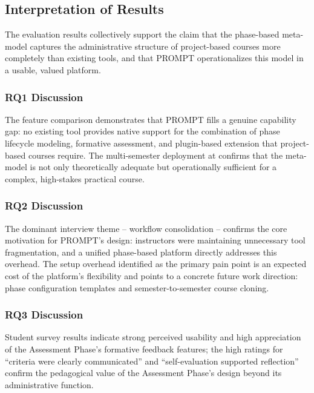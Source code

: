 
\label{sec:discussion}

\subsection{Interpretation of Results}

The evaluation results collectively support the claim that the phase-based meta-model captures the administrative structure of project-based courses more completely than existing tools, and that PROMPT operationalizes this model in a usable, valued platform.

\subsubsection{RQ1 Discussion}

The feature comparison demonstrates that PROMPT fills a genuine capability gap:
no existing tool provides native support for the combination of phase lifecycle modeling, formative assessment, and plugin-based extension that project-based courses require.
The multi-semester deployment at \university{} confirms that the meta-model is not only theoretically adequate but operationally sufficient for a complex, high-stakes practical course.

\subsubsection{RQ2 Discussion}

The dominant interview theme -- workflow consolidation -- confirms the core motivation for PROMPT's design:
instructors were maintaining unnecessary tool fragmentation, and a unified phase-based platform directly addresses this overhead.
The setup overhead identified as the primary pain point is an expected cost of the platform's flexibility and points to a concrete future work direction: phase configuration templates and semester-to-semester course cloning.

\subsubsection{RQ3 Discussion}

Student survey results indicate strong perceived usability and high appreciation of the Assessment Phase's formative feedback features;
the high ratings for ``criteria were clearly communicated'' and ``self-evaluation supported reflection'' confirm the pedagogical value of the Assessment Phase's design beyond its administrative function.

